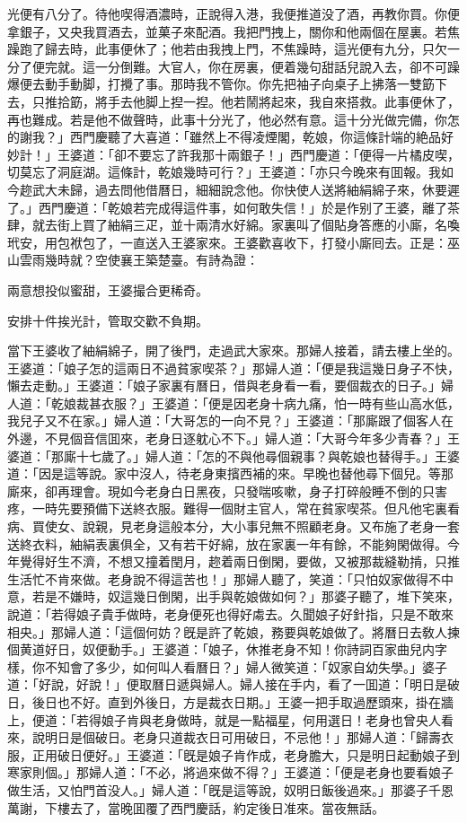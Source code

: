 光便有八分了。待他喫得酒濃時，正說得入港，我便推道没了酒，再教你買。你便拿銀子，又央我買酒去，並菓子來配酒。我把門拽上，關你和他兩個在屋裏。若焦躁跑了歸去時，此事便休了；他若由我拽上門，不焦躁時，這光便有九分，只欠一分了便完就。這一分倒難。大官人，你在房裏，便着幾句甜話兒說入去，卻不可躁爆便去動手動脚，打攪了事。那時我不管你。你先把袖子向桌子上拂落一雙筯下去，只推拾筯，將手去他脚上揑一揑。他若鬧將起來，我自來搭救。此事便休了，再也難成。若是他不做聲時，此事十分光了，他必然有意。這十分光做完備，你怎的謝我？」西門慶聽了大喜道：「雖然上不得凌煙閣，乾娘，你這條計端的絶品好妙計！」王婆道：「卻不要忘了許我那十兩銀子！」西門慶道：「便得一片橘皮喫，切莫忘了洞庭湖。這條計，乾娘幾時可行？」王婆道：「亦只今晚來有囬報。我如今趂武大未歸，過去問他借曆日，細細說念他。你快使人送將紬絹綿子來，休要遲了。」西門慶道：「乾娘若完成得這件事，如何敢失信！」於是作别了王婆，離了茶肆，就去街上買了紬絹三疋，並十兩清水好綿。家裏叫了個貼身答應的小廝，名喚玳安，用包袱包了，一直送入王婆家來。王婆歡喜收下，打發小廝囘去。正是：巫山雲雨幾時就？空使襄王築楚臺。有詩為證：

\begin{myquote}
兩意想投似蜜甜，王婆撮合更稀奇。

安排十件挨光計，管取交歡不負期。
\end{myquote}

當下王婆收了紬絹綿子，開了後門，走過武大家來。那婦人接着，請去樓上坐的。王婆道：「娘子怎的這兩日不過貧家喫茶？」那婦人道：「便是我這幾日身子不快，懶去走動。」王婆道：「娘子家裏有曆日，借與老身看一看，要個裁衣的日子。」婦人道：「乾娘裁甚衣服？」王婆道：「便是因老身十病九痛，怕一時有些山高水低，我兒子又不在家。」婦人道：「大哥怎的一向不見？」王婆道：「那廝跟了個客人在外邊，不見個音信囬來，老身日逐躭心不下。」婦人道：「大哥今年多少青春？」王婆道：「那廝十七歲了。」婦人道：「怎的不與他尋個親事？與乾娘也替得手。」王婆道：「因是這等說。家中沒人，待老身東擯西補的來。早晚也替他尋下個兒。等那廝來，卻再理會。現如今老身白日黑夜，只發喘咳嗽，身子打碎般睡不倒的只害疼，一時先要預備下送終衣服。難得一個財主官人，常在貧家喫茶。但凡他宅裏看病、買使女、說親，見老身這般本分，大小事兒無不照顧老身。又布施了老身一套送終衣料，紬絹表裏俱全，又有若干好綿，放在家裏一年有餘，不能夠閑做得。今年覺得好生不濟，不想又撞着閏月，趂着兩日倒閑，要做，又被那裁縫勒掯，只推生活忙不肯來做。老身說不得這苦也！」那婦人聽了，笑道：「只怕奴家做得不中意，若是不嫌時，奴這幾日倒閑，出手與乾娘做如何？」那婆子聽了，堆下笑來，說道：「若得娘子貴手做時，老身便死也得好䖏去。久聞娘子好針指，只是不敢來相央。」那婦人道：「這個何妨？旣是許了乾娘，務要與乾娘做了。將曆日去敎人揀個黄道好日，奴便動手。」王婆道：「娘子，休推老身不知！你詩詞百家曲兒内字樣，你不知會了多少，如何叫人看曆日？」婦人微笑道：「奴家自幼失學。」婆子道：「好說，好說！」便取曆日遞與婦人。婦人接在手内，看了一囬道：「明日是破日，後日也不好。直到外後日，方是裁衣日期。」王婆一把手取過歷頭來，掛在牆上，便道：「若得娘子肯與老身做時，就是一點福星，何用選日！老身也曾央人看來，說明日是個破日。老身只道裁衣日可用破日，不忌他！」那婦人道：「歸壽衣服，正用破日便好。」王婆道：「旣是娘子肯作成，老身膽大，只是明日起動娘子到寒家則個。」那婦人道：「不必，將過來做不得？」王婆道：「便是老身也要看娘子做生活，又怕門首没人。」婦人道：「旣是這等說，奴明日飯後過來。」那婆子千恩萬謝，下樓去了，當晚囬覆了西門慶話，約定後日准來。當夜無話。

